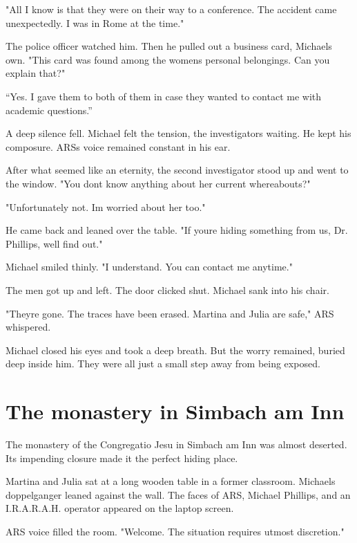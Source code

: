 \documentclass[
]{article}
\begin{document}
"All I know is that they were on their way to a conference. The accident came unexpectedly. I was in Rome at the time."

The police officer watched him. Then he pulled out a business card, Michael\textquotesingle s own. "This card was found among the women\textquotesingle s personal belongings. Can you explain that?"

``Yes. I gave them to both of them in case they wanted to contact me with academic questions.''

A deep silence fell. Michael felt the tension, the investigators\textquotesingle{} waiting. He kept his composure. ARS\textquotesingle s voice remained constant in his ear.

After what seemed like an eternity, the second investigator stood up and went to the window. "You don\textquotesingle t know anything about her current whereabouts?"

"Unfortunately not. I\textquotesingle m worried about her too."

He came back and leaned over the table. "If you\textquotesingle re hiding something from us, Dr. Phillips, we\textquotesingle ll find out."

Michael smiled thinly. "I understand. You can contact me anytime."

The men got up and left. The door clicked shut. Michael sank into his chair.

"They\textquotesingle re gone. The traces have been erased. Martina and Julia are safe," ARS whispered.

Michael closed his eyes and took a deep breath. But the worry remained, buried deep inside him. They were all just a small step away from being exposed.

\section{The monastery in Simbach am Inn}\label{the-monastery-in-simbach-am-inn}

The monastery of the Congregatio Jesu in Simbach am Inn was almost deserted. Its impending closure made it the perfect hiding place.

Martina and Julia sat at a long wooden table in a former classroom. Michael\textquotesingle s doppelganger leaned against the wall. The faces of ARS, Michael Phillips, and an I.R.A.R.A.H. operator appeared on the laptop screen.

ARS\textquotesingle{} voice filled the room. "Welcome. The situation requires utmost discretion."
\end{document}
